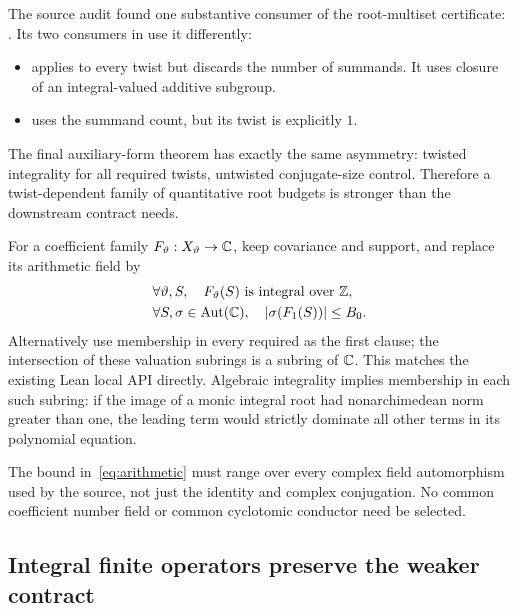 The source audit found one substantive consumer of the root-multiset certificate: . Its two consumers in  use it differently:
\begin{itemize}
\item {} applies to every twist but discards the number of summands. It uses closure of an integral-valued additive subgroup.
\item {} uses the summand count, but its twist is explicitly $1$.
\end{itemize}
The final auxiliary-form theorem has exactly the same asymmetry: twisted integrality for all required twists, untwisted conjugate-size control. Therefore a twist-dependent family of quantitative root budgets is stronger than the downstream contract needs.

For a coefficient family $F_\vartheta:X_\vartheta\to\mathbb C$, keep covariance and support, and replace its arithmetic field by
\begin{equation}\label{eq:arithmetic}
 \begin{split}
 &\forall\vartheta,S,\quad F_\vartheta(S)\text{ is integral over }\mathbb Z,\\
 &\forall S,\sigma\in\operatorname{Aut}(\mathbb C),\quad
            |\sigma(F_1(S))|\leq B_0.
 \end{split}
\end{equation}
Alternatively use membership in every required  as the first clause; the intersection of these valuation subrings is a subring of $\mathbb C$. This matches the existing Lean local API directly. Algebraic integrality implies membership in each such subring: if the image of a monic integral root had nonarchimedean norm greater than one, the leading term would strictly dominate all other terms in its polynomial equation.

The bound in~\eqref{eq:arithmetic} must range over every complex field automorphism used by the source, not just the identity and complex conjugation. No common coefficient number field or common cyclotomic conductor need be selected.

\subsection{Integral finite operators preserve the weaker contract}

